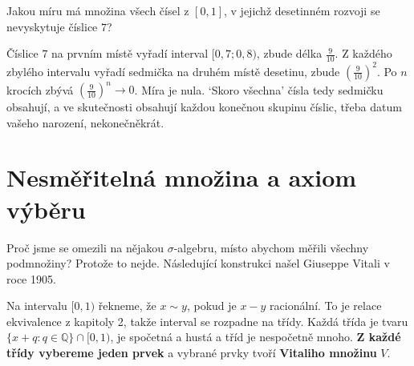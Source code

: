 \begin{problem}
  Jakou míru má množina všech čísel z $[0, 1]$, v jejichž desetinném rozvoji se nevyskytuje číslice $7$?
\end{problem}

\begin{solution}
  Číslice $7$ na prvním místě vyřadí interval $[0{,}7; 0{,}8)$, zbude délka $\frac{9}{10}$. Z každého zbylého intervalu vyřadí sedmička na druhém místě desetinu, zbude ${\left(\frac{9}{10}\right)}^2$. Po $n$ krocích zbývá ${\left(\frac{9}{10}\right)}^n\to 0$. Míra je nula. `Skoro všechna' čísla tedy sedmičku obsahují, a ve skutečnosti obsahují každou konečnou skupinu číslic, třeba datum vašeho narození, nekonečněkrát.
\end{solution}

\section{Nesměřitelná množina a axiom výběru}

Proč jsme se omezili na nějakou $\sigma$-algebru, místo abychom měřili všechny podmnožiny? Protože to nejde. Následující konstrukci našel Giuseppe Vitali v roce 1905.

Na intervalu $[0, 1)$ řekneme, že $x\sim y$, pokud je $x - y$ racionální. To je relace ekvivalence z kapitoly 2, takže interval se rozpadne na třídy. Každá třída je tvaru $\{x + q : q\in\mathbb{Q}\}\cap[0, 1)$, je spočetná a hustá a tříd je nespočetně mnoho. \textbf{Z každé třídy vybereme jeden prvek} a vybrané prvky tvoří \textbf{Vitaliho množinu} $V$.

\begin{center}
\end{center}

